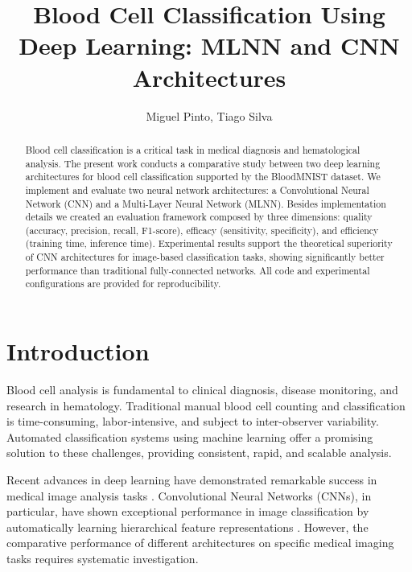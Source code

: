 \documentclass[runningheads]{llncs}
\begin{document}
\title{Blood Cell Classification Using Deep Learning: MLNN and CNN Architectures}

\author{Miguel Pinto, Tiago Silva}



\maketitle

\begin{abstract}
Blood cell classification is a critical task in medical diagnosis and hematological analysis. 
The present work conducts a comparative study between two deep learning architectures for blood cell
classification supported by the BloodMNIST dataset. We implement and evaluate two neural network 
architectures: a Convolutional Neural Network (CNN) and a Multi-Layer Neural Network (MLNN). 
Besides implementation details we created an evaluation framework composed by three dimensions:
quality (accuracy, precision, recall, F1-score), efficacy (sensitivity, specificity), 
and efficiency (training time, inference time). Experimental results support the theoretical   
superiority of CNN architectures for image-based classification tasks, showing  
significantly better performance than traditional fully-connected networks. 
All code and experimental configurations are provided for reproducibility. 

\end{abstract}

\section{Introduction}

Blood cell analysis is fundamental to clinical diagnosis, disease monitoring, and research in hematology. Traditional manual blood cell counting and classification is time-consuming, labor-intensive, and subject to inter-observer variability. Automated classification systems using machine learning offer a promising solution to these challenges, providing consistent, rapid, and scalable analysis.

Recent advances in deep learning have demonstrated remarkable success in medical image analysis tasks \cite{esteva2019guide}. Convolutional Neural Networks (CNNs), in particular, have shown exceptional performance in image classification by automatically learning hierarchical feature representations \cite{lecun2015deep}. However, the comparative performance of different architectures on specific medical imaging tasks requires systematic investigation.
\end{document}
